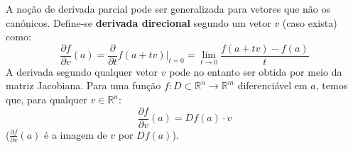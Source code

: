 \documentclass{article}
\begin{document}
A noção de derivada parcial pode ser generalizada para vetores que não os canónicos. Define-se \textbf{derivada direcional} segundo um vetor $v$ (caso exista) como:
$$
\frac{\partial f}{\partial v}(a) = \frac{\partial}{\partial t} f(a+tv) \Big|_{t=0} = \lim_{t \to 0} \frac{f(a+tv)-f(a)}{t}
$$
A derivada segundo qualquer vetor $v$ pode no entanto ser obtida por meio da matriz Jacobiana. Para uma função $f: D \subset \mathbb{R}^n \to \mathbb{R}^m$ diferenciável em $a$, temos que, para qualquer $v \in \mathbb{R}^n$:
$$
\frac{\partial f}{\partial v}(a) = Df(a) \cdot v
$$
($\frac{\partial f}{\partial v}(a)$ é a imagem de $v$ por $Df(a)$).
\end{document}
